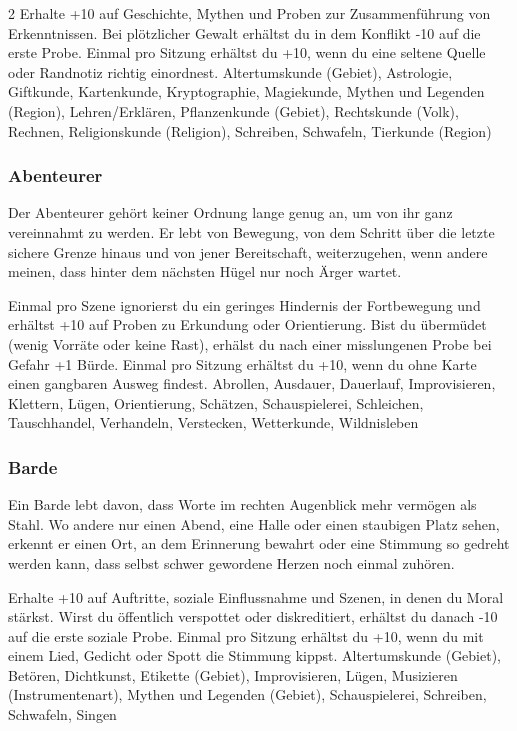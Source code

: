 {\begin{multicols*}{2}
        \wegespielwertebox
        {Erhalte +10 auf Geschichte, Mythen und Proben zur Zusammenführung von Erkenntnissen.}
        {Bei plötzlicher Gewalt erhältst du in dem Konflikt -10 auf die erste Probe.}
        {Einmal pro Sitzung erhältst du +10, wenn du eine seltene Quelle oder Randnotiz richtig einordnest.}
        {Altertumskunde (Gebiet), Astrologie, Giftkunde, Kartenkunde, Kryptographie, Magiekunde, Mythen und Legenden (Region), Lehren/Erklären, Pflanzenkunde (Gebiet), Rechtskunde (Volk), Rechnen, Religionskunde (Religion), Schreiben, Schwafeln, Tierkunde (Region)}

        \subsubsection*{Abenteurer}
        Der Abenteurer gehört keiner Ordnung lange genug an, um von ihr ganz vereinnahmt zu werden. Er lebt von Bewegung, von dem Schritt über die letzte sichere Grenze hinaus und von jener Bereitschaft, weiterzugehen, wenn andere meinen, dass hinter dem nächsten Hügel nur noch Ärger wartet.

        \wegespielwertebox
        {Einmal pro Szene ignorierst du ein geringes Hindernis der Fortbewegung und erhältst +10 auf Proben zu Erkundung oder Orientierung.}
        {Bist du übermüdet (wenig Vorräte oder keine Rast), erhälst du nach einer misslungenen Probe bei Gefahr +1 Bürde.}
        {Einmal pro Sitzung erhältst du +10, wenn du ohne Karte einen gangbaren Ausweg findest.}
        {Abrollen, Ausdauer, Dauerlauf, Improvisieren, Klettern, Lügen, Orientierung, Schätzen, Schauspielerei, Schleichen, Tauschhandel, Verhandeln, Verstecken, Wetterkunde, Wildnisleben}

        \subsubsection*{Barde}
        Ein Barde lebt davon, dass Worte im rechten Augenblick mehr vermögen als Stahl. Wo andere nur einen Abend, eine Halle oder einen staubigen Platz sehen, erkennt er einen Ort, an dem Erinnerung bewahrt oder eine Stimmung so gedreht werden kann, dass selbst schwer gewordene Herzen noch einmal zuhören.

        \wegespielwertebox
        {Erhalte +10 auf Auftritte, soziale Einflussnahme und Szenen, in denen du Moral stärkst.}
        {Wirst du öffentlich verspottet oder diskreditiert, erhältst du danach -10 auf die erste soziale Probe.}
        {Einmal pro Sitzung erhältst du +10, wenn du mit einem Lied, Gedicht oder Spott die Stimmung kippst.}
        {Altertumskunde (Gebiet), Betören, Dichtkunst, Etikette (Gebiet), Improvisieren, Lügen, Musizieren (Instrumentenart), Mythen und Legenden (Gebiet), Schauspielerei, Schreiben, Schwafeln, Singen}


\end{multicols*}}
